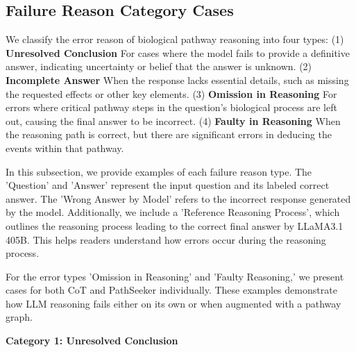 \subsection{{Failure Reason Category Cases}}

We classify the error reason of biological pathway reasoning into four types:
(1) \textbf{Unresolved Conclusion} For cases where the model fails to provide a definitive answer, indicating uncertainty or belief that the answer is unknown.
(2) \textbf{Incomplete Answer}  When the response lacks essential details, such as missing the requested effects or other key elements.
(3) \textbf{Omission in Reasoning}  For errors where critical pathway steps in the question's biological process are left out, causing the final answer to be incorrect.
(4) \textbf{Faulty in Reasoning} When the reasoning path is correct, but there are significant errors in deducing the events within that pathway.

In this subsection, we provide examples of each failure reason type. The 'Question' and 'Answer' represent the input question and its labeled correct answer. The 'Wrong Answer by Model' refers to the incorrect response generated by the model. Additionally, we include a 'Reference Reasoning Process', which outlines the reasoning process leading to the correct final answer by LLaMA3.1 405B. This helps readers understand how errors occur during the reasoning process.

For the error types 'Omission in Reasoning' and 'Faulty Reasoning,' we present cases for both CoT and PathSeeker individually. These examples demonstrate how LLM reasoning fails either on its own or when augmented with a pathway graph.




\textbf{Category 1: Unresolved Conclusion}

